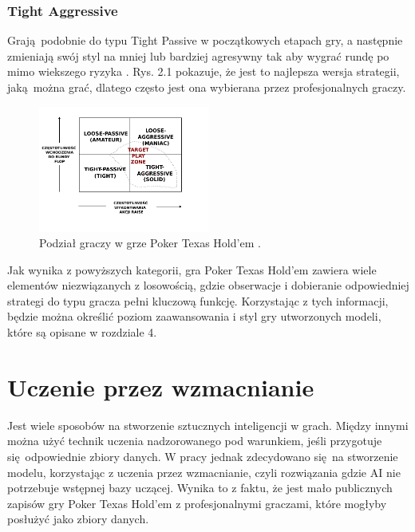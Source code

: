 \documentclass[12pt,oneside,a4paper]{report}
\begin{document}
\subsubsection{Tight Aggressive}

Grają podobnie do typu Tight Passive w początkowych etapach gry, a następnie zmieniają swój
styl na mniej lub bardziej agresywny tak aby wygrać rundę po mimo wiekszego ryzyka \cite{class}. Rys. 2.1 pokazuje, że jest to najlepsza wersja strategii, jaką można
grać, dlatego często jest ona wybierana przez profesjonalnych graczy.

\vspace{1cm}


\begin{figure}[h!]
            \center
           \includegraphics[width=0.5\textwidth]{./img/class.pdf}
           \caption{Podział graczy w grze Poker Texas Hold'em \cite{class}.}
\end{figure}


Jak wynika z powyższych kategorii, gra Poker Texas Hold'em zawiera wiele elementów niezwiązanych z
losowością, gdzie obserwacje i dobieranie odpowiedniej strategi do typu gracza pełni kluczową
funkcję. Korzystając z tych informacji, będzie można określić poziom zaawansowania i styl gry
utworzonych modeli,
które są opisane w rozdziale 4.

\section{Uczenie przez wzmacnianie}

Jest wiele sposobów na stworzenie sztucznych inteligencji w grach. Między innymi można użyć technik 
uczenia
nadzorowanego pod warunkiem, jeśli przygotuje się odpowiednie zbiory danych. W pracy jednak
zdecydowano się na stworzenie modelu, korzystając z uczenia przez wzmacnianie, czyli rozwiązania gdzie
AI nie potrzebuje wstępnej bazy uczącej. Wynika to z faktu, że jest mało publicznych zapisów
gry Poker Texas Hold'em z profesjonalnymi graczami, które mogłyby posłużyć jako zbiory danych.
\end{document}
